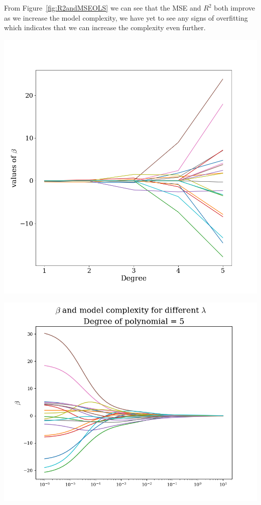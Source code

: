 \documentclass[twoside,11pt]{report}
\begin{document}
From Figure~\ref{fig:R2andMSEOLS} we can see that the MSE and $R^2$ both improve as we increase the model complexity, we have yet to see any signs of overfitting which indicates that we can increase the complexity even further.\\

\begin{minipage}[!t]{.48\linewidth}
    \begin{center}
        \includegraphics[width=1.0\textwidth]{../runsAndAdditions/betaOverOrderOLS.png}
\end{center}
\end{minipage}
\hspace{4mm}
\begin{minipage}[!t]{.48\linewidth}
    \begin{center}
        \includegraphics[width=1.0\textwidth]{../runsAndAdditions/BetaOverLambdaRidge5.png}
    \end{center}
\end{minipage}
\end{document}
